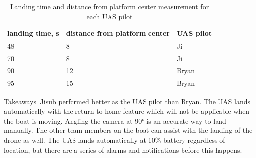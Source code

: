\documentclass{wrcecapstone}
\begin{document}
\begin{table}
\caption{Landing time and distance from platform center measurement for each UAS pilot}
\label{tab:9.2.2}
\begin{center}
\begin{tabular}{lll}
\toprule
landing time, \si{\second} & distance from platform center & UAS pilot \\
\midrule
48 & 8 & Ji \\
70 & 8 & Ji \\
90 & 12 & Bryan \\
95 & 15 & Bryan \\
\bottomrule
\end{tabular}
\end{center}
\end{table}
 
Takeaways: 
Jisub performed better as the UAS pilot than Bryan. The UAS lands automatically with the return-to-home feature which will not be applicable when the boat is moving. Angling the camera at \ang{90} is an accurate way to land manually. The other team members on the boat can assist with the landing of the drone as well. The UAS lands automatically at 10\% battery regardless of location, but there are a series of alarms and notifications before this happens.





\nocite{hyneman2017jamie, famoussmoke2019cigar} %






\end{document}

